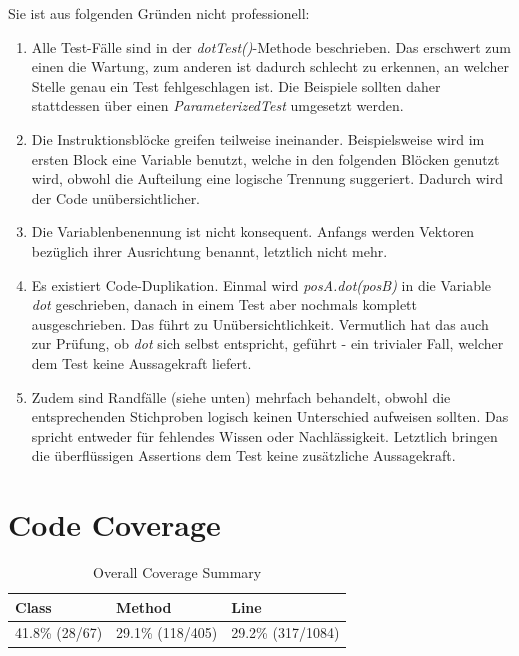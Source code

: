 Sie ist aus folgenden Gründen nicht professionell:
\begin{enumerate}
    \item Alle Test-Fälle sind in der \textit{dotTest()}-Methode
    beschrieben. Das erschwert zum einen die Wartung, zum anderen ist
    dadurch schlecht zu erkennen, an welcher Stelle genau ein Test
    fehlgeschlagen ist. Die Beispiele sollten daher stattdessen über
    einen \textit{ParameterizedTest} umgesetzt werden.
    \item Die Instruktionsblöcke greifen teilweise ineinander. 
    Beispielsweise wird im ersten Block eine Variable benutzt, welche
    in den folgenden Blöcken genutzt wird, obwohl die Aufteilung eine
    logische Trennung suggeriert. Dadurch wird der Code
    unübersichtlicher.
    \item Die Variablenbenennung ist nicht konsequent. Anfangs werden
    Vektoren bezüglich ihrer Ausrichtung benannt, letztlich nicht mehr.
    \item Es existiert Code-Duplikation. Einmal wird
    \textit{posA.dot(posB)} in die Variable \textit{dot} geschrieben,
    danach in einem Test aber nochmals komplett ausgeschrieben. Das 
    führt zu Unübersichtlichkeit. Vermutlich hat das auch zur Prüfung,
    ob \textit{dot} sich selbst entspricht, geführt - ein trivialer
    Fall, welcher dem Test keine Aussagekraft liefert.
    \item Zudem sind Randfälle (siehe unten) mehrfach behandelt,
    obwohl die entsprechenden Stichproben logisch keinen Unterschied
    aufweisen sollten. Das spricht entweder für fehlendes Wissen oder
    Nachlässigkeit. Letztlich bringen die überflüssigen Assertions
    dem Test keine zusätzliche Aussagekraft. 
\end{enumerate}

\section{Code Coverage}

\begin{table}[H]
    \centering
    \begin{tabular}{|p{3.5cm}|p{3.5cm}|p{3.5cm}|}
        \hline
        \textbf{Class} & \textbf{Method} & \textbf{Line} \\
        \hline
        41.8\% (28/67) & 29.1\% (118/405) & 29.2\% (317/1084) \\
        \hline
    \end{tabular}
    \caption{Overall Coverage Summary}
\end{table}

